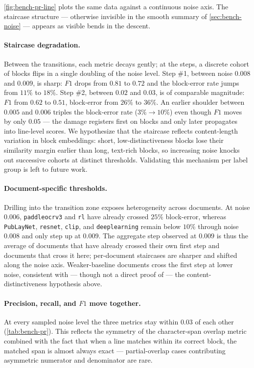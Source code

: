 \documentclass{article}
\theoremstyle{definition}
\begin{document}
\cref{fig:bench-pr-line} plots the same data against a continuous
noise axis.  The staircase structure --- otherwise invisible in the
smooth summary of \cref{sec:bench-noise} --- appears as visible bends
in the descent.

\paragraph{Staircase degradation.}
Between the transitions, each metric decays gently; at the steps, a
discrete cohort of blocks flips in a single doubling of the noise
level.  Step \#1, between noise $0.008$ and $0.009$, is sharp: $F1$
drops from $0.81$ to $0.72$ and the block-error rate jumps from
$11\%$ to $18\%$.  Step \#2, between $0.02$ and $0.03$, is of
comparable magnitude: $F1$ from $0.62$ to $0.51$, block-error from
$26\%$ to $36\%$.  An earlier shoulder between $0.005$ and $0.006$
triples the block-error rate ($3\% \to 10\%$) even though $F1$ moves
by only $0.05$ --- the damage registers first on blocks and only
later propagates into line-level scores.  We hypothesize that the
staircase reflects content-length variation in block embeddings:
short, low-distinctiveness blocks lose their similarity margin earlier
than long, text-rich blocks, so increasing noise knocks out successive
cohorts at distinct thresholds.  Validating this mechanism per label
group is left to future work.

\paragraph{Document-specific thresholds.}
Drilling into the transition zone exposes heterogeneity across
documents.  At noise $0.006$, \texttt{paddleocrv3} and \texttt{rl}
have already crossed $25\%$ block-error, whereas \texttt{PubLayNet},
\texttt{resnet}, \texttt{clip}, and \texttt{deeplearning} remain
below $10\%$ through noise $0.008$ and only step up at $0.009$.  The
aggregate step observed at $0.009$ is thus the average of documents
that have already crossed their own first step and documents that
cross it here; per-document staircases are sharper and shifted along
the noise axis.  Weaker-baseline documents cross the first step at
lower noise, consistent with --- though not a direct proof of --- the
content-distinctiveness hypothesis above.

\paragraph{Precision, recall, and $F1$ move together.}
At every sampled noise level the three metrics stay within $0.03$ of
each other (\cref{tab:bench-pr}).  This reflects the symmetry of the
character-span overlap metric combined with the fact that when a line
matches within its correct block, the matched span is almost always
exact --- partial-overlap cases contributing asymmetric numerator and
denominator are rare.
\end{document}
